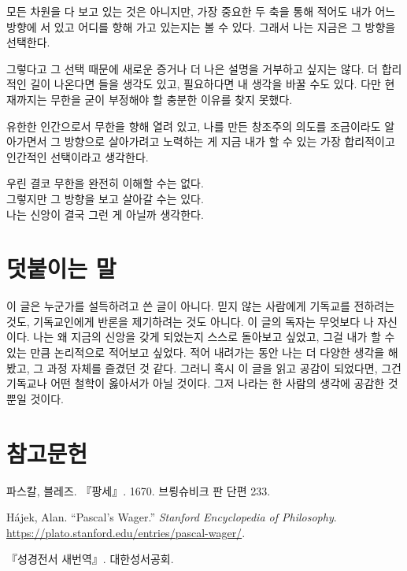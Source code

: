 \documentclass[11pt]{article}
\begin{document}
모든 차원을 다 보고 있는 것은 아니지만, 가장 중요한 두 축을 통해 적어도 내가 어느
방향에 서 있고 어디를 향해 가고 있는지는 볼 수 있다. 그래서 나는 지금은 그 방향을
선택한다.

그렇다고 그 선택 때문에 새로운 증거나 더 나은 설명을 거부하고 싶지는 않다. 더
합리적인 길이 나온다면 들을 생각도 있고, 필요하다면 내 생각을 바꿀 수도 있다.
다만 현재까지는 무한을 굳이 부정해야 할 충분한 이유를 찾지 못했다.

유한한 인간으로서 무한을 향해 열려 있고, 나를 만든 창조주의 의도를 조금이라도
알아가면서 그 방향으로 살아가려고 노력하는 게 지금 내가 할 수 있는 가장
합리적이고 인간적인 선택이라고 생각한다.

\vspace{0.6em}

\begin{center}
우린 결코 무한을 완전히 이해할 수는 없다.\\
그렇지만 그 방향을 보고 살아갈 수는 있다.\\
나는 신앙이 결국 그런 게 아닐까 생각한다.
\end{center}

\section*{덧붙이는 말}

{\small
\noindent 이 글은 누군가를 설득하려고 쓴 글이 아니다. 믿지 않는 사람에게 기독교를
전하려는 것도, 기독교인에게 반론을 제기하려는 것도 아니다. 이 글의 독자는
무엇보다 나 자신이다. 나는 왜 지금의 신앙을 갖게 되었는지 스스로 돌아보고
싶었고, 그걸 내가 할 수 있는 만큼 논리적으로 적어보고 싶었다. 적어 내려가는
동안 나는 더 다양한 생각을 해봤고, 그 과정 자체를 즐겼던 것 같다. 그러니 혹시
이 글을 읽고 공감이 되었다면, 그건 기독교나 어떤 철학이 옳아서가 아닐 것이다.
그저 나라는 한 사람의 생각에 공감한 것뿐일 것이다.\par}

\section*{참고문헌}

{\footnotesize
\begin{list}{}{\setlength{\leftmargin}{1.6em}\setlength{\itemindent}{-1.6em}
               \setlength{\itemsep}{0.15em}\setlength{\parsep}{0pt}}
  \item 파스칼, 블레즈. 『팡세』. 1670. 브룅슈비크 판 단편 233.
  \item Hájek, Alan. “Pascal's Wager.” \emph{Stanford Encyclopedia of
        Philosophy}. \url{https://plato.stanford.edu/entries/pascal-wager/}.
  \item 『성경전서 새번역』. 대한성서공회.
\end{list}\par}
\end{document}
